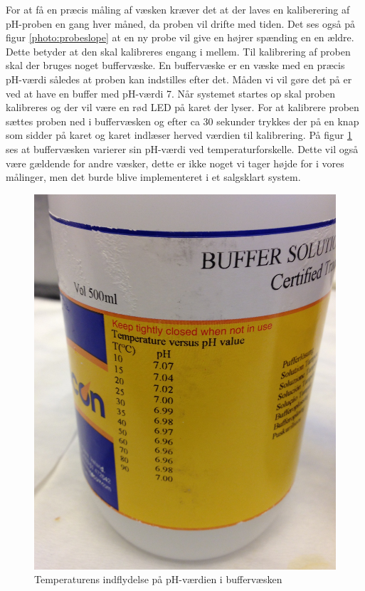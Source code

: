 For at få en præcis måling af væsken kræver det at der laves en kaliberering af pH-proben en gang hver måned, da proben vil drifte med tiden. Det ses også på figur \ref{photo:probeslope} at en ny probe vil give en højrer spænding en en ældre. Dette betyder at den skal kalibreres engang i mellem. Til kalibrering af proben skal der bruges noget buffervæske. En buffervæske er en væske med en præcis pH-værdi således at proben kan indstilles efter det. Måden vi vil gøre det på er ved at have en buffer med pH-værdi 7. Når systemet startes op skal proben kalibreres og der vil være en rød LED på karet der lyser. For at kalibrere proben sættes proben ned i buffervæsken og efter ca 30 sekunder trykkes der på en knap som sidder på karet og karet indlæser herved værdien til kalibrering. På figur \ref{photo:buffer_vaeske} ses at buffervæsken varierer sin pH-værdi ved temperaturforskelle. Dette vil også være gældende for andre væsker, dette er ikke noget vi tager højde for i vores målinger, men det burde blive implementeret i et salgsklart system. 

 \begin{figure}[H]
	\centering 
	\includegraphics[scale=0.1]{HardwareArkitektur/Sensore/pH_probe_billeder/buffervaeske.jpg}
	\caption{Temperaturens indflydelse på pH-værdien i buffervæsken}
	\label{photo:buffer_vaeske}
\end{figure} 


